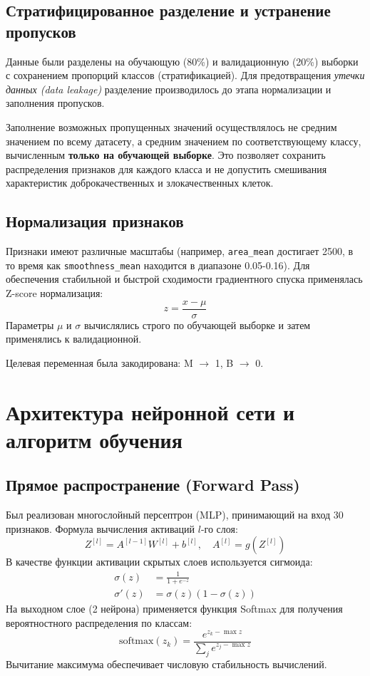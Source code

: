 \documentclass[a4paper,14pt]{extarticle}
\begin{document}
\subsection{Стратифицированное разделение и устранение пропусков}
Данные были разделены на обучающую (80\%) и валидационную (20\%) выборки с сохранением пропорций классов (стратификацией). Для предотвращения \textit{утечки данных (data leakage)} разделение производилось до этапа нормализации и заполнения пропусков.

Заполнение возможных пропущенных значений осуществлялось не средним значением по всему датасету, а средним значением по соответствующему классу, вычисленным \textbf{только на обучающей выборке}. Это позволяет сохранить распределения признаков для каждого класса и не допустить смешивания характеристик доброкачественных и злокачественных клеток.

\subsection{Нормализация признаков}
Признаки имеют различные масштабы (например, \texttt{area\_mean} достигает 2500, в то время как \texttt{smoothness\_mean} находится в диапазоне 0.05-0.16). Для обеспечения стабильной и быстрой сходимости градиентного спуска применялась Z-score нормализация:
\begin{equation}
    z = \frac{x - \mu}{\sigma}
\end{equation}
Параметры $\mu$ и $\sigma$ вычислялись строго по обучающей выборке и затем применялись к валидационной. 

Целевая переменная была закодирована: M $\rightarrow$ 1, B $\rightarrow$ 0.

\section{Архитектура нейронной сети и алгоритм обучения}
\subsection{Прямое распространение (Forward Pass)}
Был реализован многослойный персептрон (MLP), принимающий на вход 30 признаков. Формула вычисления активаций $l$-го слоя:
\begin{equation}
    Z^{[l]} = A^{[l-1]} W^{[l]} + b^{[l]}, \quad A^{[l]} = g(Z^{[l]})
\end{equation}
В качестве функции активации скрытых слоев используется сигмоида:
\begin{align}
    \sigma(z) &= \frac{1}{1 + e^{-z}} \\
    \sigma'(z) &= \sigma(z)(1 - \sigma(z))
\end{align}
На выходном слое (2 нейрона) применяется функция Softmax для получения вероятностного распределения по классам:
\begin{equation}
    \text{softmax}(z_k) = \frac{e^{z_k - \max z}}{\sum_j e^{z_j - \max z}}
\end{equation}
Вычитание максимума обеспечивает числовую стабильность вычислений.
\end{document}
